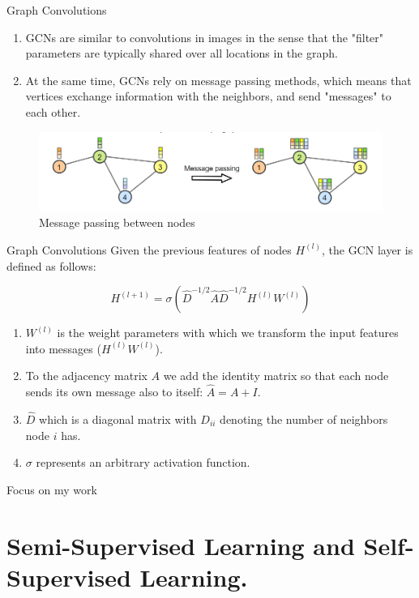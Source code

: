 \documentclass{beamer}
\begin{document}
	\begin{frame}[t]{Graph Convolutions}\vspace{4pt}
	\begin{enumerate}
		\item GCNs are similar to convolutions in images in the sense that the "filter" parameters are typically shared over all locations in the graph. 
		\item At the same time, GCNs rely on message passing methods, which means that vertices exchange information with the neighbors, and send "messages" to each other.
	\end{enumerate}
	
	\begin{figure}
		\centering
		\includegraphics[scale=0.4]{sg2.png}
		\caption{Message passing between nodes}
	\end{figure}
	\end{frame}

	\begin{frame}[t]{Graph Convolutions}\vspace{4pt}
	Given the previous features of nodes $H^{(l)}$, the GCN layer is defined as follows:
	
	$$H^{(l+1)} = \sigma\left(\hat{D}^{-1/2}\hat{A}\hat{D}^{-1/2}H^{(l)}W^{(l)}\right)$$
	\begin{enumerate}
		\item $W^{(l)}$ is the weight parameters with which we transform the input features into messages ($H^{(l)}W^{(l)}$). 
		\item To the adjacency matrix $A$ we add the identity matrix so that each node sends its own message also to itself: $\hat{A}=A+I$. 
		\item $\hat{D}$ which is a diagonal matrix with $D_{ii}$ denoting the number of neighbors node $i$ has. 
		\item $\sigma$ represents an arbitrary activation function.
	\end{enumerate}
	\end{frame}

	\begin{frame}[t]{Focus on my work}
		\section{Semi-Supervised Learning and Self-Supervised Learning.}
	\end{frame}	
\end{document}

